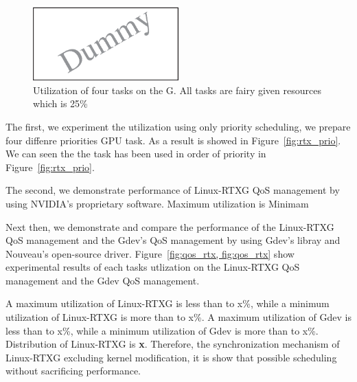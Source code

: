 \begin{figure}[t]
\begin{center}
\includegraphics[width=0.5\textwidth]{img/dummy}
\caption{Utilization of four tasks on the G. All tasks are fairy given resources which is 25\%}
\end{center}
\label{fig:qos_gdev}
\end{figure}
\fi
The first, we experiment the utilization using only priority scheduling, we prepare four diffenre priorities GPU task.
As a result is showed in Figure~\ref{fig:rtx_prio}.
We can seen the the task has been used in order of priority in Figure~\ref{fig:rtx_prio}.

The second, we demonstrate performance of Linux-RTXG QoS management by using NVIDIA's proprietary software.
Maximum utilization is Minimam 

Next then, we demonstrate and compare the performance of the Linux-RTXG QoS management and the Gdev's QoS management by using Gdev's libray and Nouveau's open-source driver.
Figure~\ref{fig:qos_rtx, fig:qos_rtx} show experimental results of each tasks utlization on the Linux-RTXG QoS management and the Gdev QoS management.

A maximum utilization of Linux-RTXG is less than to x\%, while a minimum utilization of Linux-RTXG is more than to x\%.
A maximum utilization of Gdev is less than to x\%, while a minimum utilization of Gdev is more than to x\%.
Distribution of Linux-RTXG is \textbf{x}.
Therefore, the synchronization mechanism of Linux-RTXG excluding kernel modification,
it is show that possible scheduling without sacrificing performance.




